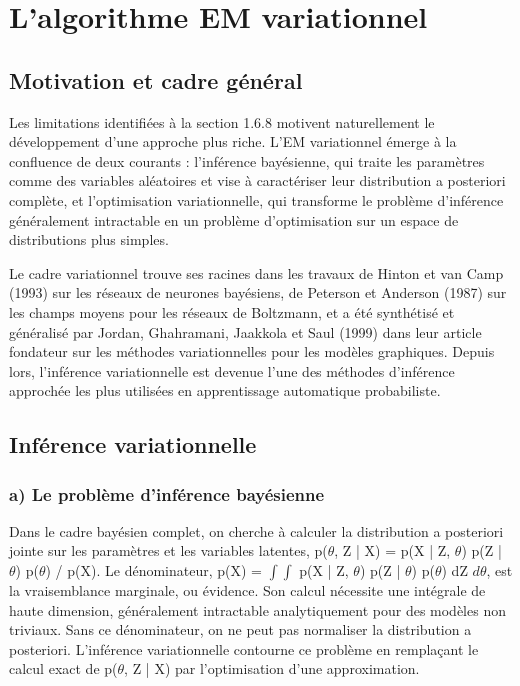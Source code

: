 \section{L'algorithme EM variationnel}
\subsection{Motivation et cadre général}
Les limitations identifiées à la section 1.6.8 motivent naturellement le développement d'une approche plus riche. L'EM variationnel émerge à la confluence de deux courants : l'inférence bayésienne, qui traite les paramètres comme des variables aléatoires et vise à caractériser leur distribution a posteriori complète, et l'optimisation variationnelle, qui transforme le problème d'inférence  généralement intractable  en un problème d'optimisation sur un espace de distributions plus simples.

Le cadre variationnel trouve ses racines dans les travaux de Hinton et van Camp (1993) sur les réseaux de neurones bayésiens, de Peterson et Anderson (1987) sur les champs moyens pour les réseaux de Boltzmann, et a été synthétisé et généralisé par Jordan, Ghahramani, Jaakkola et Saul (1999) dans leur article fondateur sur les méthodes variationnelles pour les modèles graphiques. Depuis lors, l'inférence variationnelle est devenue l'une des méthodes d'inférence approchée les plus utilisées en apprentissage automatique probabiliste.

\subsection{Inférence variationnelle}
\subsubsection{a) Le problème d'inférence bayésienne}
Dans le cadre bayésien complet, on cherche à calculer la distribution a posteriori jointe sur les paramètres et les variables latentes, p($\theta $, Z | X) = p(X | Z, $\theta $) p(Z | $\theta $) p($\theta $) / p(X). Le dénominateur, p(X) = $\int \int $ p(X | Z, $\theta $) p(Z | $\theta $) p($\theta $) dZ $d\theta $, est la vraisemblance marginale, ou évidence. Son calcul nécessite une intégrale de haute dimension, généralement intractable analytiquement pour des modèles non triviaux. Sans ce dénominateur, on ne peut pas normaliser la distribution a posteriori. L'inférence variationnelle contourne ce problème en remplaçant le calcul exact de p($\theta $, Z | X) par l'optimisation d'une approximation.

